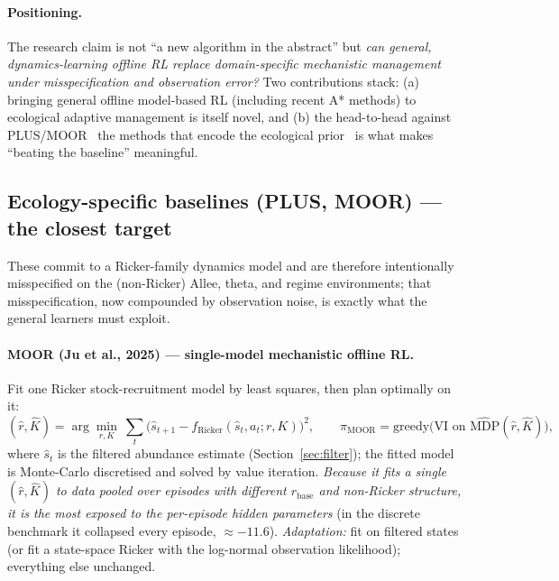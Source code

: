 \documentclass[11pt]{article}
\newcommand{\rbase}{r_{\mathrm{base}}}
\begin{document}
\paragraph{Positioning.} The research claim is not ``a new algorithm in the
abstract'' but \emph{can general, dynamics-learning offline RL replace
domain-specific mechanistic management under misspecification and observation
error?} Two contributions stack: (a) bringing general offline model-based RL
(including recent A* methods) to ecological adaptive management is itself novel,
and (b) the head-to-head against PLUS/MOOR \textemdash\ the methods that encode the
ecological prior \textemdash\ is what makes ``beating the baseline'' meaningful.

\subsection{Ecology-specific baselines (PLUS, MOOR) --- the closest target}
\label{sec:eco}
These commit to a Ricker-family dynamics model and are therefore intentionally
misspecified on the (non-Ricker) Allee, theta, and regime environments; that
misspecification, now compounded by observation noise, is exactly what the general
learners must exploit.
\paragraph{MOOR (Ju et al., 2025) --- single-model mechanistic offline RL.} Fit one
Ricker stock-recruitment model by least squares, then plan optimally on it:
\begin{equation}
(\hat r, \hat K) = \arg\min_{r,K}\ \textstyle\sum_t \big(\hat s_{t+1} - f_{\mathrm{Ricker}}(\hat s_t, a_t; r, K)\big)^2,
\qquad \pi_{\mathrm{MOOR}} = \text{greedy}\big(\text{VI on } \widehat{\mathrm{MDP}}(\hat r,\hat K)\big),
\end{equation}
where $\hat s_t$ is the filtered abundance estimate (Section~\ref{sec:filter}); the
fitted model is Monte-Carlo discretised and solved by value iteration.
\emph{Because it fits a single $(\hat r,\hat K)$ to data pooled over episodes with
different $\rbase$ and non-Ricker structure, it is the most exposed to the
per-episode hidden parameters} (in the discrete benchmark it collapsed every
episode, $\approx -11.6$). \emph{Adaptation:} fit on filtered states (or fit a
state-space Ricker with the log-normal observation likelihood); everything else
unchanged.
\end{document}
